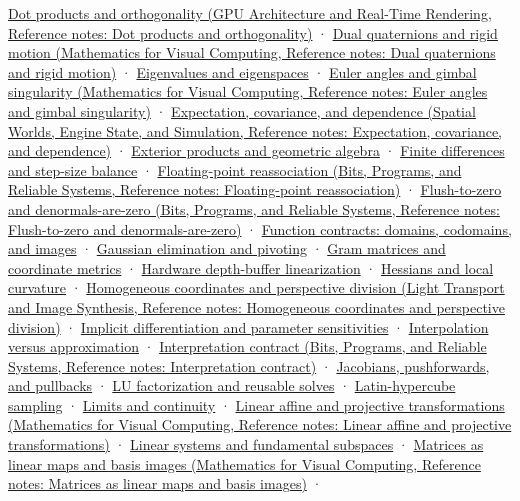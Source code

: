 \href{../06-GPU-Architecture-and-Real-Time-Rendering/main.pdf\#nameddest=appendix-8bc4e8fc547c}{Dot products and orthogonality (GPU Architecture and Real-Time Rendering, Reference notes: Dot products and orthogonality)} · \href{../02-Mathematics-for-Visual-Computing/main.pdf\#nameddest=appendix-d1ea57347893}{Dual quaternions and rigid motion (Mathematics for Visual Computing, Reference notes: Dual quaternions and rigid motion)} · \hyperref[appendix-0b3be18411f9]{Eigenvalues and eigenspaces} · \href{../02-Mathematics-for-Visual-Computing/main.pdf\#nameddest=appendix-5f723fbd0593}{Euler angles and gimbal singularity (Mathematics for Visual Computing, Reference notes: Euler angles and gimbal singularity)} · \href{../05-Spatial-Worlds-Engine-State-and-Simulation/main.pdf\#nameddest=appendix-54c383df9992}{Expectation, covariance, and dependence (Spatial Worlds, Engine State, and Simulation, Reference notes: Expectation, covariance, and dependence)} · \hyperref[appendix-e1960925d1b8]{Exterior products and geometric algebra} · \hyperref[appendix-e2d7b4f2161d]{Finite differences and step-size balance} · \href{../01-Bits-Programs-and-Reliable-Systems/main.pdf\#nameddest=appendix-c2ac4a84c283}{Floating-point reassociation (Bits, Programs, and Reliable Systems, Reference notes: Floating-point reassociation)} · \href{../01-Bits-Programs-and-Reliable-Systems/main.pdf\#nameddest=appendix-e979eb012782}{Flush-to-zero and denormals-are-zero (Bits, Programs, and Reliable Systems, Reference notes: Flush-to-zero and denormals-are-zero)} · \hyperref[appendix-a59658325cd6]{Function contracts: domains, codomains, and images} · \hyperref[appendix-f6e77f4a200f]{Gaussian elimination and pivoting} · \hyperref[appendix-3b863809f82a]{Gram matrices and coordinate metrics} · \hyperref[appendix-1bc40b08db4a]{Hardware depth-buffer linearization} · \hyperref[appendix-6ac071f8b50c]{Hessians and local curvature} · \href{../04-Light-Transport-and-Image-Synthesis/main.pdf\#nameddest=appendix-cb3b26862282}{Homogeneous coordinates and perspective division (Light Transport and Image Synthesis, Reference notes: Homogeneous coordinates and perspective division)} · \hyperref[appendix-8836553d56fc]{Implicit differentiation and parameter sensitivities} · \hyperref[appendix-0c2a5f69851e]{Interpolation versus approximation} · \href{../01-Bits-Programs-and-Reliable-Systems/main.pdf\#nameddest=appendix-f414bd4ed05c}{Interpretation contract (Bits, Programs, and Reliable Systems, Reference notes: Interpretation contract)} · \hyperref[appendix-d8a7ddb675eb]{Jacobians, pushforwards, and pullbacks} · \hyperref[appendix-55e4b5b0a1e6]{LU factorization and reusable solves} · \hyperref[appendix-1c5e85693a06]{Latin-hypercube sampling} · \hyperref[appendix-fecc1847f5a3]{Limits and continuity} · \href{../02-Mathematics-for-Visual-Computing/main.pdf\#nameddest=appendix-0bf0ca73f735}{Linear affine and projective transformations (Mathematics for Visual Computing, Reference notes: Linear affine and projective transformations)} · \hyperref[appendix-8572a4a060c1]{Linear systems and fundamental subspaces} · \href{../02-Mathematics-for-Visual-Computing/main.pdf\#nameddest=appendix-bd39c3bf5d64}{Matrices as linear maps and basis images (Mathematics for Visual Computing, Reference notes: Matrices as linear maps and basis images)} · 